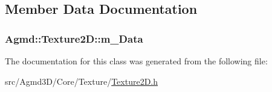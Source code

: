 \subsection{Member Data Documentation}
\hypertarget{class_agmd_1_1_texture2_d_a364f4407132d02473df2398198614646}{
\subsubsection[{m\+\_\+\+Data}]{ Agmd\+::\+Texture2\+D\+::m\+\_\+\+Data\hspace{0.3cm}{\ttfamily [protected]}}}\label{class_agmd_1_1_texture2_d_a364f4407132d02473df2398198614646}


The documentation for this class was generated from the following file\+:\begin{DoxyCompactItemize}
\item 
src/\+Agmd3\+D/\+Core/\+Texture/\hyperlink{_texture2_d_8h}{Texture2\+D.\+h}\end{DoxyCompactItemize}
